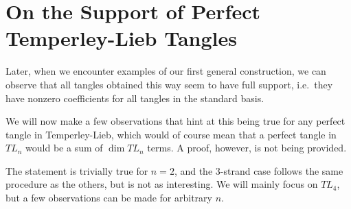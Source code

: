 \section{On the Support of Perfect Temperley-Lieb Tangles}
Later, when we encounter examples of our first general construction, we can observe that all tangles obtained this way seem to have full support, i.e.\ they have nonzero coefficients for all tangles in the standard basis.

We will now make a few observations that hint at this being true for any perfect tangle in Temperley-Lieb, which would of course mean that a perfect tangle in $TL_n$ would be a sum of $\dim TL_n$ terms. A proof, however, is not being provided.

\bigno The statement is trivially true for $n=2$, and the $3$-strand case follows the same procedure as the others, but is not as interesting. We will mainly focus on $TL_4$, but a few observations can be made for arbitrary $n$.

